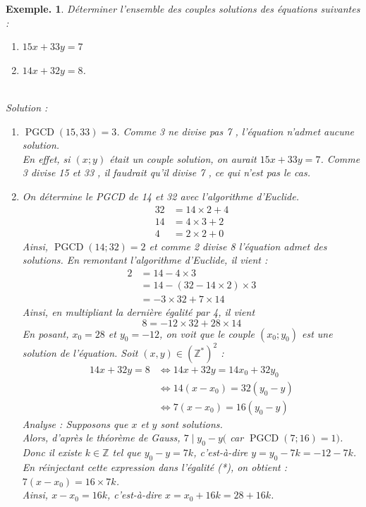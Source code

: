 \documentclass[12pt]{article}
\theoremstyle{break}
\newtheorem*{example}{Exemple.}
\begin{document}
\begin{example}
Déterminer l'ensemble des couples solutions des équations suivantes :

\begin{enumerate}[noitemsep,topsep=0pt]
  \item $15 x+33 y=7$
  \item $14 x+32 y=8$.
\end{enumerate}

~\\Solution :\\
\begin{enumerate}
  \item $\operatorname{PGCD}(15,33)=3$. Comme 3 ne divise pas 7 , l'équation n'admet aucune solution.\\
  En effet, si $(x ; y)$ était un couple solution, on aurait $15 x+33 y=7$. Comme 3 divise 15 et 33 , il faudrait qu'il divise 7 , ce qui n'est pas le cas.
  \item On détermine le PGCD de 14 et 32 avec l'algorithme d'Euclide.
$$
\begin{aligned}
32 & =14 \times 2+4 \\
14 & =4 \times 3+2 \\
4 & =2 \times 2+0
\end{aligned}
$$
Ainsi, $\operatorname{PGCD}(14 ; 32)=2$ et comme 2 divise 8 l'équation admet des solutions. En remontant l'algorithme d'Euclide, il vient :
$$
\begin{aligned}
2 & =14-4 \times 3 \\
& =14-(32-14 \times 2) \times 3 \\
& =-3 \times 32+7 \times 14
\end{aligned}
$$
Ainsi, en multipliant la dernière égalité par 4, il vient
$$
8=-12 \times 32+28 \times 14
$$
En posant, $x_{0}=28$ et $y_{0}=-12$, on voit que le couple $\left(x_{0} ; y_{0}\right)$ est une solution de l'équation. Soit $(x, y) \in\left(\mathbb{Z}^{*}\right)^{2}$ :
$$
\begin{aligned}
14 x+32 y=8 & \Longleftrightarrow 14 x+32 y=14 x_{0}+32 y_{0} \\
& \Longleftrightarrow 14\left(x-x_{0}\right)=32\left(y_{0}-y\right) \\
& \Longleftrightarrow 7\left(x-x_{0}\right)=16\left(y_{0}-y\right)
\end{aligned}
$$
Analyse : Supposons que $x$ et $y$ sont solutions.\\
Alors, d'après le théorème de Gauss, $7 \mid y_{0}-y($ car $\operatorname{PGCD}(7 ; 16)=1)$.\\
Donc il existe $k \in \mathbb{Z}$ tel que $y_{0}-y=7 k$, c'est-à-dire $y=y_{0}-7 k=-12-7 k$.\\
En réinjectant cette expression dans l'égalité (*), on obtient : $7\left(x-x_{0}\right)=16 \times 7 k$.\\
Ainsi, $x-x_{0}=16 k$, c'est-à-dire $x=x_{0}+16 k=28+16 k$.


\end{enumerate}
\end{example}
\end{document}
